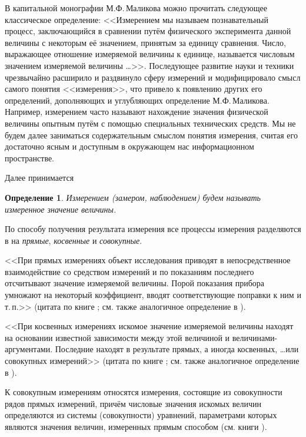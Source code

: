 \documentclass[a5paper,openany]{book}
\newtheorem{definition}{Определение}[section]
\begin{document}
В капитальной монографии М.Ф.\,Маликова \cite{Malikov} можно прочитать следующее 
классическое определение: <<Измерением мы называем познавательный процесс, 
заключающийся в сравнении путём физического эксперимента данной величины с некоторым 
её значением, принятым за единицу сравнения. Число, выражающее отношение измеряемой 
величины к единице, называется числовым значением измеряемой величины \ldots>>. 
Последующее развитие науки и техники чрезвычайно расширило и раздвинуло сферу измерений 
и модифицировало смысл самого понятия <<измерения>>, что привело к появлению других его 
определений,  дополняющих и углубляющих определение М.Ф.\,Маликова. Например, измерением 
часто называют нахождение значения физической величины опытным путём с помощью 
специальных технических средств. Мы не будем далее заниматься содержательным 
смыслом понятия измерения, считая его достаточно ясным и доступным в окружающем 
нас информационном пространстве. 
   
Далее принимается  
  
\begin{definition}       
\textsl{Измерением (замером, наблюдением)} будем называть измеренное значение величины. 
\end{definition}
  
По способу получения результата измерения все процессы измерения разделяются 
в \cite{Malikov} на \emph{прямые}, \emph{косвенные} и \emph{совокупные}. 
  
<<При прямых измерениях объект исследования приводят в непосредственное взаимодействие 
со средством измерений и по показаниям последнего отсчитывают значение измеряемой 
величины. Порой показания прибора умножают на некоторый коэффициент, вводят 
соответствующие поправки к ним и т.\,п.>> (цитата по книге \cite{Rabinovich1978}; 
см. также аналогичное определение в \cite{Malikov}).   
  
<<При косвенных измерениях искомое значение измеряемой величины находят на основании 
известной зависимости между этой величиной и величинами-аргументами. Последние находят 
в результате прямых, а иногда косвенных, \ldots или совокупных измерений>> (цитата 
по книге \cite{Rabinovich1978}; см. также аналогичное определение в \cite{Malikov}). 
  
К совокупным измерениям относятся измерения, состоящие из совокупности рядов прямых 
измерений, причём числовые значения искомых величин определяются из системы (совокупности)  
уравнений, параметрами которых являются значения величин, измеренных прямым способом  
(см. книги \cite{Malikov,Rabinovich1978}). 
\end{document}

